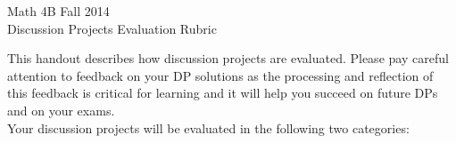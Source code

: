 \documentclass[epsf]{article}
\begin{document}
\newcommand{\R}{\mathbb{R}}
\newcommand{\noi}{\noindent}
\newcommand{\bs}{\bigskip}


\begin{center}
{\Large Math 4B Fall 2014\\
\vskip 4mm
 Discussion Projects Evaluation Rubric}
\end{center}

This handout describes how discussion projects are evaluated.  Please pay careful attention to feedback on your DP solutions as the processing and reflection of this feedback is critical for learning and it will help you succeed on future DPs and on your exams. \\

Your discussion projects will be evaluated in the following two categories:
\end{document}
